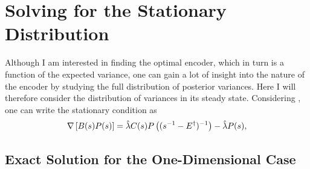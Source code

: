 
\section{Solving for the Stationary Distribution}
Although I am interested in finding the optimal encoder, which in turn is a function of the expected variance, one can gain a lot of insight into the nature of the encoder by studying the 
full distribution of posterior variances. Here I will therefore consider the distribution of variances in its steady state. Considering 
, one can write the stationary condition as
\begin{equation}
\label{eq:equilibrium_DCKE_sigma}
\nabla \left[B(s) P(s)\right] = \hat{\lambda} C(s) P\left( (s^{-1} - \covar^\dagger)^{-1}\right) -\hat{\lambda} P(s),
\end{equation}

\subsection{Exact Solution for the One-Dimensional Case}

